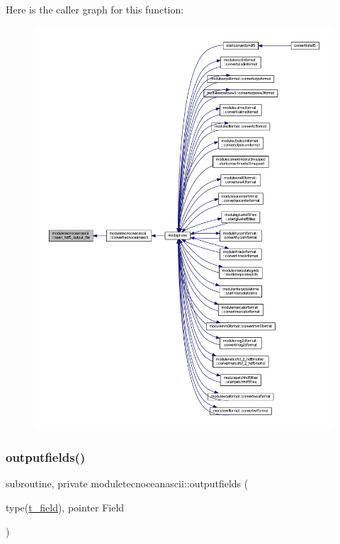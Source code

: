 Here is the caller graph for this function\+:\nopagebreak
\begin{figure}[H]
\begin{center}
\leavevmode
\includegraphics[width=350pt]{namespacemoduletecnoceanascii_a59efcea92a5574ed7914c0950859e175_icgraph}
\end{center}
\end{figure}
\mbox{\label{namespacemoduletecnoceanascii_a690ef71c676ca809af1adce385db6855}} 
\subsubsection{\texorpdfstring{outputfields()}{outputfields()}}
{\footnotesize\ttfamily subroutine, private moduletecnoceanascii\+::outputfields (\begin{DoxyParamCaption}\item[{type(\mbox{\hyperlink{structmoduletecnoceanascii_1_1t__field}{t\+\_\+field}}), pointer}]{Field }\end{DoxyParamCaption})\hspace{0.3cm}{\ttfamily [private]}}

